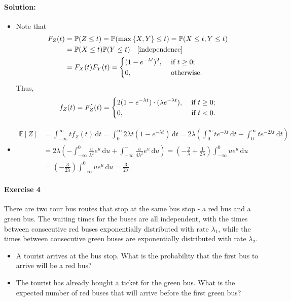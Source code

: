 \documentclass[a4paper,12pt]{article}
\begin{document}
\paragraph{Solution:}
\begin{itemize}
	\item [(a)] Note that 
	\begin{align*}
		F_Z(t) &= \mathbb{P} (Z \le t) = \mathbb{P} (\max \left\{ X, Y \right\} \le t) = \mathbb{P} (X \le t, Y \le t) \\
		&= \mathbb{P} (X \le t) \mathbb{P} (Y \le t) \quad \text{[independence]} \\
		&= F_X(t) F_Y(t) = \begin{dcases}
			(1 - e^{-\lambda t})^2, &\text{ if } t \ge 0 ;\\
			0, &\text{ otherwise} .
		\end{dcases}
	\end{align*}
	Thus,
	\[
		f_Z(t) = F_Z^{\prime} (t) = \begin{dcases}
			2 (1 - e^{-\lambda t}) \cdot (\lambda e^{-\lambda t}), &\text{ if } t \ge 0 ;\\
			0, &\text{ if }  t < 0.
		\end{dcases}
	\]
	\item [(b)] 
	\begin{align*}
		\mathbb{E} [Z] &= \int _{-\infty }^{\infty } t f_Z(t) \, \mathrm{d} t = \int _0^{\infty} 2 \lambda t (1 - e^{-\lambda t}) \, \mathrm{d} t = 2\lambda \left( \int _0^{\infty } t e^{-\lambda t} \, \mathrm{d} t - \int _0^{\infty } t e^{-2 \lambda t} \, \mathrm{d} t   \right) \\
		&= 2\lambda \left( -\int _{-\infty }^0 \frac{u}{\lambda ^2} e^u \, \mathrm{d} u + \int _{-\infty }^- \frac{u}{4 \lambda ^2} e^u \, \mathrm{d} u   \right) = \left( - \frac{2}{\lambda} + \frac{1}{2 \lambda} \right) \int _{-\infty }^0 u e^u \, \mathrm{d} u \\
		&= \left( - \frac{3}{2 \lambda} \right) \int _{-\infty }^0 u e^u \, \mathrm{d} u = \frac{3}{2 \lambda}.        
	\end{align*}
\end{itemize}

\paragraph{Exercise 4}  There are two tour bus routes that stop at the same bus stop - a red bus and a green bus. The waiting times for the buses are all independent, with the times between consecutive red buses exponentially distributed with rate $\lambda_1$, while the times between consecutive green buses are exponentially distributed with rate $\lambda_2$. 
\begin{itemize}
	\item[(a)] A tourist arrives at the bus stop. What is the probability that the first bus to arrive will be a red bus?
	\item[(b)] The tourist has already bought a ticket for the green bus. What is the expected number of red buses that will arrive before the first green bus?
\end{itemize}
\end{document}
